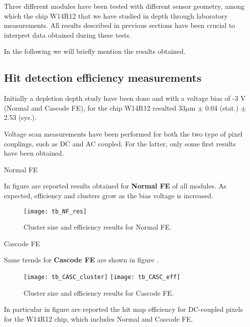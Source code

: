Three different modules have been tested with different sensor geometry, among which the chip W14R12 that we have studied in depth through laboratory measurements. All results described in previous sections have been crucial to interpret data obtained during these tests.

In the following we will briefly mention the results obtained.


\subsection{Hit detection efficiency measurements}

Initially a depletion depth study have been done and with a voltage bias of -3 V (Normal and Cascode FE), for the chip W14R12 resulted 33$\mu$m $\pm$ 0.04 (stat.) $\pm$ 2.53 (sys.).

Voltage scan measurements have been performed for both the two type of pixel couplings, such as DC and AC coupled. For the latter, only some first results have been obtained. 

\begin{description}
\item[Normal FE]
\end{description}

In figure  are reported results obtained for \textbf{Normal FE} of all modules. As expected, efficiency and clusters grow as the bias voltage is increased. 

\begin{figure}[h!]
\centering
\texttt{[image: tb\_NF\_res]}
\caption{Cluster size and efficiency results for Normal FE.}
\label{fig:tb_NF}
\end{figure}


\begin{description}
\item[Cascode FE]
\end{description}

Same trends for \textbf{Cascode FE} are shown in figure .

\begin{figure}[h!]
\centering
\subfigure
{\texttt{[image: tb\_CASC\_cluster]}}\quad
\subfigure
{\texttt{[image: tb\_CASC\_eff]}}\\
\caption{Cluster size and efficiency results for Cascode FE.}
\label{fig:tb_CASC}
\end{figure}


In particular in figure  are reported the hit map efficiency for DC-coupled pixels for the W14R12 chip, which includes Normal and Cascode FE.

